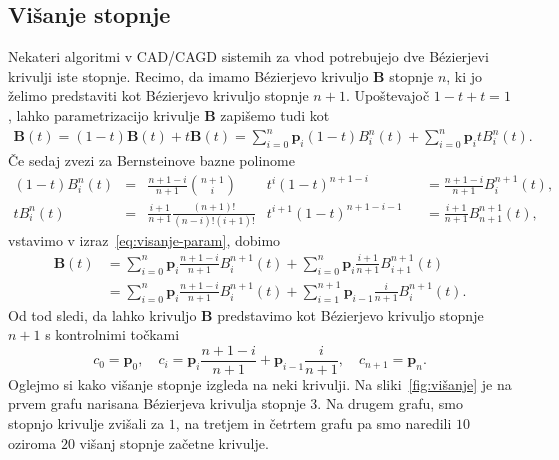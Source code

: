 \documentclass[isrm2, tisk]{fmfdelo}
\newcommand{\p}{\mathbf{p}}
\newcommand{\B}{\mathbf{B}}
\begin{document}
    \subsection{Višanje stopnje}
    Nekateri algoritmi v CAD/CAGD sistemih za vhod potrebujejo dve Bézierjevi krivulji iste stopnje.
    Recimo, da imamo Bézierjevo krivuljo $\B$ stopnje $n$, ki jo želimo predstaviti kot Bézierjevo krivuljo stopnje $n+1$.
    Upoštevajoč $1-t+t=1$, lahko parametrizacijo krivulje $\B$ zapišemo tudi kot
    \begin{align}
        \B(t) = (1-t)\B(t)+t\B(t) = \sum_{i=0}^{n}\mathbf{p}_{i}(1-t)B_i^n(t) +\sum_{i=0}^{n}\mathbf{p}_{i}tB_i^n(t). \label{eq:visanje-param}
    \end{align}
    Če sedaj zvezi za Bernsteinove bazne polinome
    \begin{align*}
    (1-t)
        B_i^n(t) &= & \frac{n+1-i}{n+1} \binom{n+1}{i}&t^i(1-t)^{n+1-i} & &=\frac{n+1-i}{n+1}B_{i}^{n+1}(t), \\
        tB_i^n(t) &= & \frac{i+1}{n+1}\frac{(n+1)!}{(n-i)!(i+1)!}&t^{i+1}(1-t)^{n+1-i-1} & &= \frac{i+1}{n+1}B_{n+1}^{n+1}(t),
    \end{align*}
    vstavimo v izraz~\eqref{eq:visanje-param}, dobimo
    \begin{align*}
        \B(t) &= \sum_{i=0}^{n}\mathbf{p}_{i}\frac{n+1-i}{n+1}B_{i}^{n+1}(t) +\sum_{i=0}^{n}\mathbf{p}_{i}\frac{i+1}{n+1}B_{i+1}^{n+1}(t)\\
        &= \sum_{i=0}^{n}\mathbf{p}_{i}\frac{n+1-i}{n+1}B_{i}^{n+1}(t) +\sum_{i=1}^{n+1}\mathbf{p}_{i-1}\frac{i}{n+1}B_{i}^{n+1}(t).
    \end{align*}
    Od tod sledi, da lahko krivuljo $\B$ predstavimo kot Bézierjevo krivuljo stopnje $n+1$ s kontrolnimi točkami \[c_0=\p_0, \quad c_i=\mathbf{p}_{i}\frac{n+1-i}{n+1} + \mathbf{p}_{i-1}\frac{i}{n+1},\quad c_{n+1}=\p_n. \]
    Oglejmo si kako višanje stopnje izgleda na neki krivulji.
    Na sliki~\ref{fig:višanje} je na prvem grafu narisana Bézierjeva krivulja stopnje $3$.
    Na drugem grafu, smo stopnjo krivulje zvišali za $1$, na tretjem in četrtem grafu pa smo naredili $10$ oziroma $20$ višanj stopnje začetne krivulje.
\end{document}
